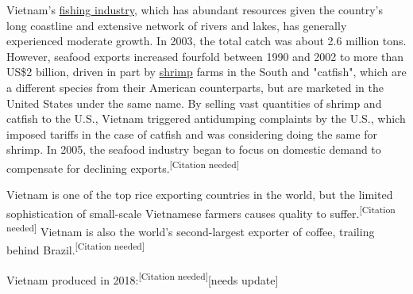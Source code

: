 \documentclass[openany]{book}
\begin{document}
Vietnam's \href{https://en.wikipedia.org/wiki/Fishing}{fishing industry}, which has abundant resources given the country's long coastline and extensive network of rivers and lakes, has generally experienced moderate growth. In 2003, the total catch was about 2.6 million tons. However, seafood exports increased fourfold between 1990 and 2002 to more than US\$2 billion, driven in part by \href{https://en.wikipedia.org/wiki/Shrimp}{shrimp} farms in the South and "catfish", which are a different species from their American counterparts, but are marketed in the United States under the same name. By selling vast quantities of shrimp and catfish to the U.S., Vietnam triggered antidumping complaints by the U.S., which imposed tariffs in the case of catfish and was considering doing the same for shrimp. In 2005, the seafood industry began to focus on domestic demand to compensate for declining exports.\textsuperscript{[Citation needed]}

Vietnam is one of the top rice exporting countries in the world, but the limited sophistication of small-scale Vietnamese farmers causes quality to suff\-er.\textsuperscript{[Citation needed]} Vietnam is also the world's second-largest exporter of coffee, trailing behind Brazil.\textsuperscript{[Citation needed]}

Vietnam produced in 2018:\textsuperscript{[Citation needed]}[needs update]
\end{document}
